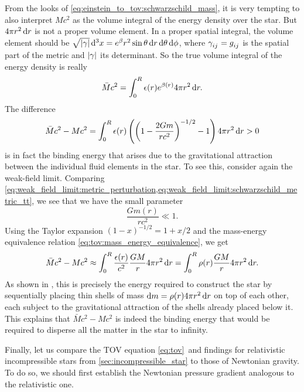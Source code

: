 From the looks of \cref{eq:einstein_to_tov:schwarzschild_mass}, it is very tempting to also interpret $M c^2$ as the volume integral of the energy density over the star.
But $4 \pi r^2 \dif r$ is not a proper volume element.
In a proper spatial integral, the volume element should be $\sqrt{\abs{\gamma}} \dif^3 x = e^\beta r^2 \sin \theta \dif r \dif \theta \dif \phi$, where $\gamma\indices{_i_j} = g\indices{_i_j}$ is the spatial part of the metric and $\abs{\gamma}$ its determinant.
So the true volume integral of the energy density is really
\begin{equation*}
	\bar{M} c^2 = \integral{\epsilon(r) e^{\beta(r)} 4 \pi r^2}{r}{0}{R}.
\end{equation*}
The difference
\begin{equation*}
	\bar{M} c^2 - M c^2 = \integral{\epsilon(r) \left( \left( 1-\frac{2Gm}{rc^2} \right)^{-1/2} - 1 \right) 4 \pi r^2}{r}{0}{R} > 0
\end{equation*}
is in fact the binding energy that arises due to the gravitational attraction between the individual fluid elements in the star.
To see this, consider again the weak-field limit.
Comparing \cref{eq:weak_field_limit:metric_perturbation,eq:weak_field_limit:schwarzschild_metric_tt}, we see that we have the small parameter
\begin{equation}
	\frac{G m(r)}{rc^2} \ll 1 .
	\label{eq:weak_field_limit:small_gmr}
\end{equation}
Using the Taylor expansion $(1 - x)^{-1/2} = 1 + x/2$ and the mass-energy equivalence relation \eqref{eq:tov:mass_energy_equivalence}, we get
\begin{equation}
	\bar{M} c^2 - M c^2 \approx \integral{\frac{\epsilon(r)}{c^2} \frac{GM}{r} 4 \pi r^2}{r}{0}{R}
	                    =       \integral{\rho(r) \frac{GM}{r} 4 \pi r^2}{r}{0}{R} .
\end{equation}
As shown in \cite[exercise 23.7]{ref:mtw}, this is precisely the energy required to construct the star by sequentially placing thin shells of mass $\dif m = \rho(r) 4 \pi r^2 \dif r$ on top of each other, each subject to the gravitational attraction of the shells already placed below it.
This explains that $\bar{M} c^2 - M c^2$ is indeed the binding energy that would be required to disperse all the matter in the star to infinity.

Finally, let us compare the TOV equation \eqref{eq:tov} and findings for relativistic incompressible stars from \cref{sec:incompressible_star} to those of Newtonian gravity.
To do so, we should first establish the Newtonian pressure gradient analogous to the relativistic one.

